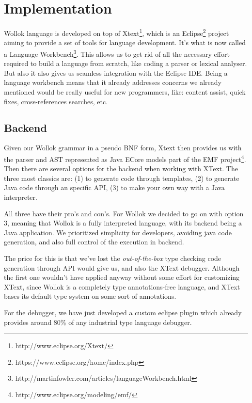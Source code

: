 \section{Implementation}
\label{sec:implementation}

Wollok language is developed on top of Xtext\footnote{http://www.eclipse.org/Xtext/}, which is an Eclipse\footnote{https://www.eclipse.org/home/index.php} project aiming to provide a set of tools for language development. It’s what is now called a Language Workbench\footnote{http://martinfowler.com/articles/languageWorkbench.html}.
This allows us to get rid of all the necessary effort required to build a
language from scratch, like coding a parser or lexical analyser. But also it
also gives us seamless integration with the Eclipse IDE. Being a language
workbench means that it already addresses concerns we already mentioned would be
really useful for new programmers, like: content assist, quick fixes, cross-references searches, etc.

\subsection{Backend}

Given our Wollok grammar in a pseudo BNF form, Xtext then provides us with the parser and AST represented as Java ECore models part of the EMF project\footnote{http://www.eclipse.org/modeling/emf/}. Then there are several options for the backend when working with XText. The three most classics are: (1) to generate code through templates, (2) to generate Java code through an specific API, (3) to make your own way with a Java interpreter.

All three have their pro’s and con’s. For Wollok we decided to go on with option 3, meaning that Wollok is a fully interpreted language, with its backend being a Java application.
We prioritized simplicity for developers, \eg avoiding java code generation, and also full control of the execution in backend. 

The price for this is that we’ve lost the \emph{out-of-the-box} type checking code generation through API would give us, and also the XText debugger.
Although the first one wouldn’t have applied anyway without some effort for
customizing XText, since Wollok is a completely type annotations-free language,
and XText bases its default type system on some sort of annotations.

For the debugger, we have just developed a custom eclipse plugin which already
provides around 80\% of any industrial type language debugger.

